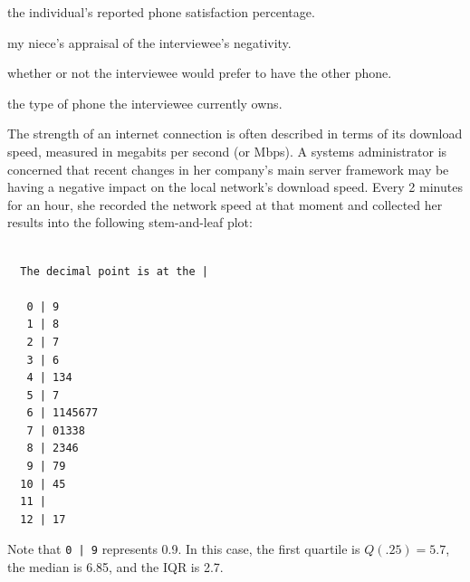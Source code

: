 \documentclass[addpoints]{examsetup}\usepackage[]{graphicx}\usepackage[]{color}
\makeatletter
\newenvironment{kframe}{%
 \def\at@end@of@kframe{}%
 \ifinner\ifhmode%
  \def\at@end@of@kframe{\end{minipage}}%
  \begin{minipage}{\columnwidth}%
 \fi\fi%
 \def\FrameCommand##1{\hskip\@totalleftmargin \hskip-\fboxsep
 \colorbox{shadecolor}{##1}\hskip-\fboxsep
     \hskip-\linewidth \hskip-\@totalleftmargin \hskip\columnwidth}%
 \MakeFramed {\advance\hsize-\width
   \@totalleftmargin\z@ \linewidth\hsize
   \@setminipage}}%
 {\par\unskip\endMakeFramed%
 \at@end@of@kframe}
\newenvironment{knitrout}{}{} %
\makeatother
\begin{document}
\begin{questions}
\begin{parts}
\begin{itemize}
   \end{itemize}

   \begin{subparts}

      \subpart the individual's reported phone satisfaction percentage.

      \vspace{2cm}

      \subpart my niece's appraisal of the interviewee's negativity.

      \vspace{2cm}

      \subpart whether or not the interviewee would prefer to have the other phone.

      \vspace{2cm}

      \subpart the type of phone the interviewee currently owns.

   \end{subparts}

\end{parts}
\pagebreak

\question 



The strength of an internet connection is often described in terms of its download speed, measured in megabits per second (or Mbps).
A systems administrator is concerned that recent changes in her company's main server framework may be having a negative impact on the local network's download speed.
Every 2 minutes for an hour, she recorded the network speed at that moment and collected her results into the following stem-and-leaf plot:

\begin{knitrout}
\color{fgcolor}\begin{kframe}
\begin{verbatim}

  The decimal point is at the |

   0 | 9
   1 | 8
   2 | 7
   3 | 6
   4 | 134
   5 | 7
   6 | 1145677
   7 | 01338
   8 | 2346
   9 | 79
  10 | 45
  11 | 
  12 | 17
\end{verbatim}
\end{kframe}
\end{knitrout}

Note that \verb!0 | 9! represents 0.9. In this case, the first quartile is $Q(.25) = 5.7$, the median is 6.85, and the IQR is 2.7.


\end{questions}
\end{document}
